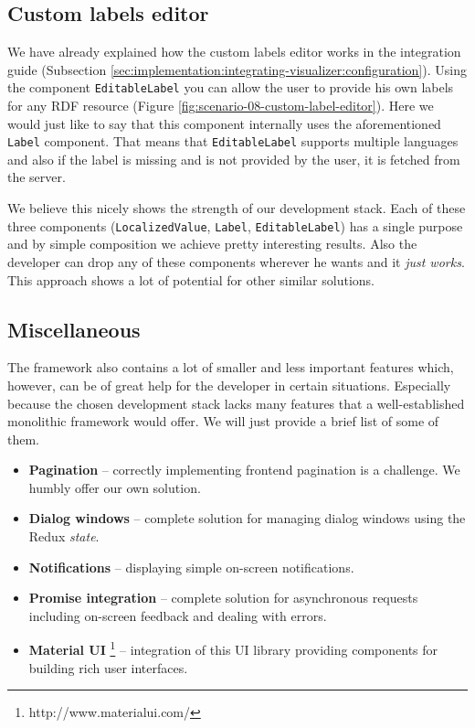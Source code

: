 \subsection{Custom labels editor}
\label{sec:implementation:advanced-features:custom-labels-editor}

We have already explained how the custom labels editor works in the integration guide (Subsection \ref{sec:implementation:integrating-visualizer:configuration}). Using the component \texttt{EditableLabel} you can allow the user to provide his own labels for any RDF resource (Figure \ref{fig:scenario-08-custom-label-editor}). Here we would just like to say that this component internally uses the aforementioned \texttt{Label} component. That means that \texttt{EditableLabel} supports multiple languages and also if the label is missing and is not provided by the user, it is fetched from the server.

We believe this nicely shows the strength of our development stack. Each of these three components (\texttt{LocalizedValue}, \texttt{Label}, \texttt{EditableLabel}) has a single purpose and by simple composition we achieve pretty interesting results. Also the developer can drop any of these components wherever he wants and it \emph{just works}. This approach shows a lot of potential for other similar solutions.

\subsection{Miscellaneous}

The framework also contains a lot of smaller and less important features which, however, can be of great help for the developer in certain situations. Especially because  the chosen development stack lacks many features that a well-established monolithic framework would offer.  We will just provide a brief list of some of them. 

\begin{itemize}
\item \textbf{Pagination} -- correctly implementing frontend pagination is a challenge. We humbly offer our own solution.
\item \textbf{Dialog windows} -- complete solution for managing dialog windows using the Redux \emph{state}.
\item \textbf{Notifications} -- displaying simple on-screen notifications.
\item \textbf{Promise integration} -- complete solution for asynchronous requests including on-screen feedback and dealing with errors.
\item \textbf{Material UI} \footnote{http://www.material\-ui.com/} -- integration of this UI library providing components for building rich user interfaces.

\end{itemize}
